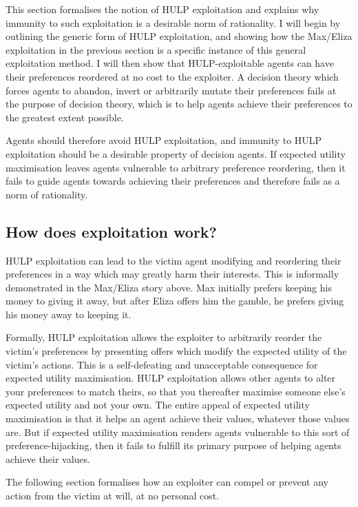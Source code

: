 \documentclass{article}
\begin{document}
This section formalises the notion of HULP exploitation and explains why immunity to such exploitation is a desirable norm of rationality. I will begin by outlining the generic form of HULP exploitation, and showing how the Max/Eliza exploitation in the previous section is a specific instance of this general exploitation method. I will then show that HULP-exploitable agents can have their preferences reordered at no cost to the exploiter. A decision theory which forces agents to abandon, invert or arbitrarily mutate their preferences fails at the purpose of decision theory, which is to help agents achieve their preferences to the greatest extent possible. 

Agents should therefore avoid HULP exploitation, and immunity to HULP exploitation should be a desirable property of decision agents. If expected utility maximisation leaves agents vulnerable to arbitrary preference reordering, then it fails to guide agents towards achieving their preferences and therefore fails as a norm of rationality. 

\subsection{How does exploitation work?}

HULP exploitation can lead to the victim agent modifying and reordering their preferences in a way which may greatly harm their interests. This is informally demonstrated in the Max/Eliza story above. Max initially prefers keeping his money to giving it away, but after Eliza offers him the gamble, he prefers giving his money away to keeping it.

Formally, HULP exploitation allows the exploiter to arbitrarily reorder the victim's preferences by presenting offers which modify the expected utility of the victim's actions. This is a self-defeating and unacceptable consequence for expected utility maximisation. HULP exploitation allows other agents to alter your preferences to match theirs, so that you thereafter maximise someone else's expected utility and not your own. The entire appeal of expected utility maximisation is that it helps an agent achieve their values, whatever those values are. But if expected utility maximisation renders agents vulnerable to this sort of preference-hijacking, then it fails to fulfill its primary purpose of helping agents achieve their values.

The following section formalises how an exploiter can compel or prevent any action from the victim at will, at no personal cost. 
\end{document}
